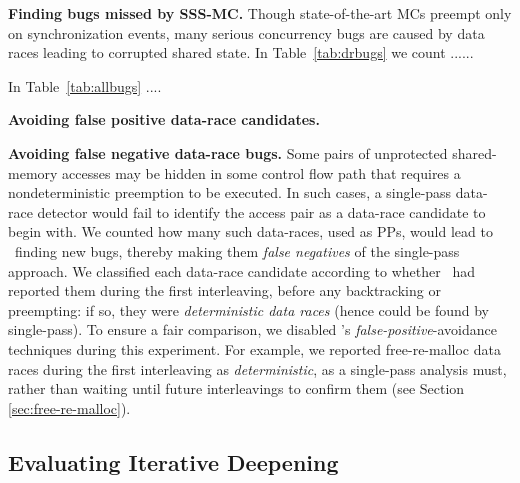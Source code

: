 {\bf Finding bugs missed by SSS-MC.}
Though state-of-the-art MCs preempt only on synchronization events, many serious concurrency bugs are caused by data races leading to corrupted shared state.
In Table~\ref{tab:drbugs} we count ...... %

In Table~\ref{tab:allbugs} .... %

{\bf Avoiding false positive data-race candidates.}


{\bf Avoiding false negative data-race bugs.}
Some pairs of unprotected shared-memory accesses may be hidden in some control flow path that requires a nondeterministic preemption to be executed.
In such cases, a single-pass data-race detector
would fail
to identify the access pair as a data-race candidate to begin with.
%
We counted how many such data-races, used as PPs, would lead to \landslide~finding new bugs,
thereby making them {\em false negatives} of the single-pass approach.
We classified each data-race candidate according to whether \landslide~had reported them during the first interleaving, before any backtracking or preempting: if so, they were {\em deterministic data races} (hence could be found by single-pass).
%
To ensure a fair comparison, we disabled \landslide's {\em false-positive}-avoidance techniques during this experiment.
For example, we reported free-re-malloc data races during the first interleaving as {\em deterministic}, as a single-pass analysis must, rather than waiting until future interleavings to confirm them (see Section \ref{sec:free-re-malloc}).

\subsection{Evaluating Iterative Deepening}



